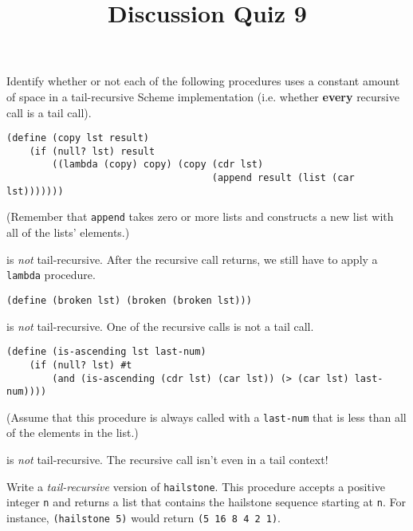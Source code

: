 \documentclass[twoside]{article}
\title{\sc Discussion Quiz 9 \solution{Solutions}}
\newcommand{\solution}[1]{{\color{red}#1}}
\begin{document}
\thispagestyle{empty}
\maketitle

\begin{enumerate}

Identify whether or not each of the following procedures uses a constant amount of space in a tail-recursive Scheme implementation (i.e. whether \textbf{every} recursive call is a tail call).

\begin{lstlisting}
(define (copy lst result)
    (if (null? lst) result
        ((lambda (copy) copy) (copy (cdr lst)
                                    (append result (list (car lst)))))))
\end{lstlisting}

(Remember that {\tt append} takes zero or more lists and constructs a new list with all of the lists' elements.)

\solution{{\tt copy} is \emph{not} tail-recursive. After the recursive call returns, we still have to apply a {\tt lambda} procedure.}
\newline

\begin{lstlisting}
(define (broken lst) (broken (broken lst)))
\end{lstlisting}

\solution{{\tt broken} is \emph{not} tail-recursive. One of the recursive calls is not a tail call.}
\newline

\begin{lstlisting}
(define (is-ascending lst last-num)
    (if (null? lst) #t
        (and (is-ascending (cdr lst) (car lst)) (> (car lst) last-num))))
\end{lstlisting}

(Assume that this procedure is always called with a {\tt last-num} that is less than all of the elements in the list.)

\solution{{\tt is-ascending} is \emph{not} tail-recursive. The recursive call isn't even in a tail context!}
\newline


Write a \emph{tail-recursive} version of {\tt hailstone}. This procedure accepts a positive integer {\tt n} and returns a list that contains the hailstone sequence starting at {\tt n}. For instance, {\tt (hailstone 5)} would return {\tt (5 16 8 4 2 1)}.


\end{enumerate}
\end{document}
